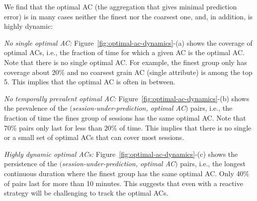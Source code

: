  We find that the optimal AC (the aggregation that gives minimal prediction error) is in many cases neither the finest nor the coarsest one, and, in addition, is highly dynamic:
 
\begin{packeditemize}
	\item {\it No single optimal AC:} Figure~\ref{fig:optimal-ac-dynamics}-(a) shows the coverage of optimal ACs, i.e., the fraction of time for which a given AC is the optimal AC. Note that there is no single optimal AC. For example, the finest group only has coverage about 20\% and no coarsest grain AC (single attribute) is among the top 5. This implies that the optimal AC is often in between.
	\item {\it No temporally prevalent optimal AC:} Figure~\ref{fig:optimal-ac-dynamics}-(b) shows the prevalence of the $($\emph{session-under-prediction, optimal AC}$)$ pairs, i.e., the fraction of time the fines group of sessions has the same optimal AC. Note that $70\%$ pairs only last for less than $20\%$ of time. This implies that there is no single or a small set of optimal ACs that can cover most sessions.
	\item {\it Highly dynamic optimal ACs:} Figure~\ref{fig:optimal-ac-dynamics}-(c) shows the persistence of the $($\emph{session-under-prediction, optimal AC}$)$ pairs, i.e., the longest continuous duration where the finest group has the same optimal AC. Only 40\% of pairs last for more than 10 minutes. This suggests that even with a reactive strategy will be challenging to track the optimal ACs.
\end{packeditemize}



